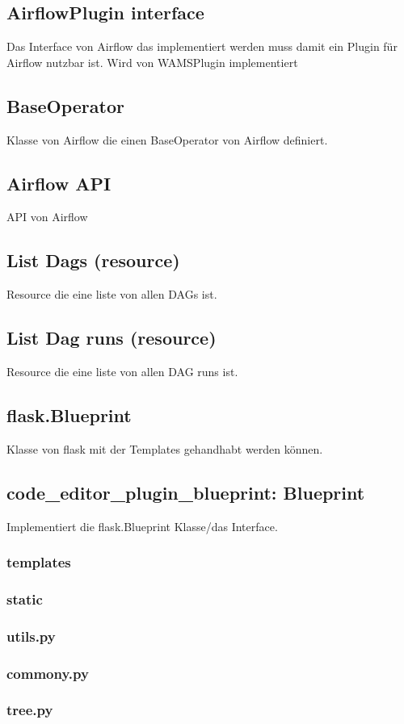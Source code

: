\subsection{AirflowPlugin interface}
Das Interface von Airflow das implementiert werden muss damit ein Plugin für Airflow nutzbar ist. Wird von WAMSPlugin implementiert

\subsection{BaseOperator}
Klasse von Airflow die einen BaseOperator von Airflow definiert. 

\subsection{Airflow API}
API von Airflow

\subsection{List Dags (resource)}
Resource die eine liste von allen DAGs ist.

\subsection{List Dag runs (resource)}
Resource die eine liste von allen DAG runs ist. 

\subsection{flask.Blueprint}
Klasse von flask mit der Templates gehandhabt werden können.

\subsection{code\_editor\_plugin\_blueprint: Blueprint}
Implementiert die flask.Blueprint Klasse/das Interface. 



\subsubsection{templates}

\subsubsection{static}

\subsubsection{utils.py}
\subsubsection{commony.py}

\subsubsection{tree.py}

